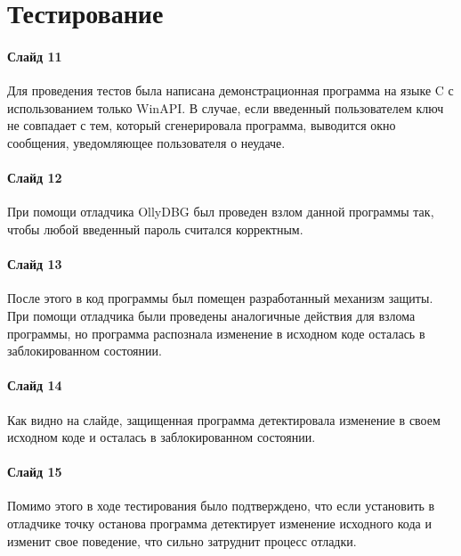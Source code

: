 
\section{Тестирование}

\paragraph{Слайд 11}\mbox{}\par

Для проведения тестов была написана демонстрационная программа на языке C с
использованием только WinAPI. В случае, если введенный пользователем ключ не
совпадает с тем, который сгенерировала программа, выводится окно сообщения,
уведомляющее пользователя о неудаче.

\paragraph{Слайд 12}\mbox{}\par
При помощи отладчика OllyDBG был проведен взлом данной программы так, чтобы
любой введенный пароль считался корректным.

\paragraph{Слайд 13}\mbox{}\par
После этого в код программы был помещен разработанный механизм защиты. При
помощи отладчика были проведены аналогичные действия для взлома программы, но
программа распознала изменение в исходном коде осталась в заблокированном
состоянии.

\paragraph{Слайд 14}\mbox{}\par
Как видно на слайде, защищенная программа детектировала изменение в своем
исходном коде и осталась в заблокированном состоянии.

\paragraph{Слайд 15}\mbox{}\par
Помимо этого в ходе тестирования было подтверждено, что если установить в
отладчике точку останова программа детектирует изменение исходного кода и
изменит свое поведение, что сильно затруднит процесс отладки.
